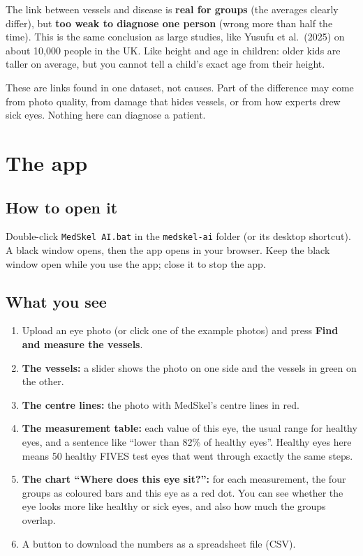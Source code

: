 \documentclass[11pt,a4paper]{article}
\begin{document}
\begin{remember}
The link between vessels and disease is \textbf{real for groups} (the averages clearly differ), but \textbf{too weak to diagnose one person} (wrong more than half the time). This is the same conclusion as large studies, like Yusufu et al.\ (2025) on about 10,000 people in the UK. Like height and age in children: older kids are taller on average, but you cannot tell a child's exact age from their height.
\end{remember}

\begin{honest}
These are links found in one dataset, not causes. Part of the difference may come from photo quality, from damage that hides vessels, or from how experts drew sick eyes. Nothing here can diagnose a patient.
\end{honest}

\section{The app}

\subsection{How to open it}
Double-click \texttt{MedSkel AI.bat} in the \texttt{medskel-ai} folder (or its desktop shortcut). A black window opens, then the app opens in your browser. Keep the black window open while you use the app; close it to stop the app.

\subsection{What you see}
\begin{enumerate}
  \item Upload an eye photo (or click one of the example photos) and press \textbf{Find and measure the vessels}.
  \item \textbf{The vessels:} a slider shows the photo on one side and the vessels in green on the other.
  \item \textbf{The centre lines:} the photo with MedSkel's centre lines in red.
  \item \textbf{The measurement table:} each value of this eye, the usual range for healthy eyes, and a sentence like ``lower than 82\% of healthy eyes''. Healthy eyes here means 50 healthy FIVES test eyes that went through exactly the same steps.
  \item \textbf{The chart ``Where does this eye sit?'':} for each measurement, the four groups as coloured bars and this eye as a red dot. You can see whether the eye looks more like healthy or sick eyes, and also how much the groups overlap.
  \item A button to download the numbers as a spreadsheet file (CSV).
\end{enumerate}
\end{document}
